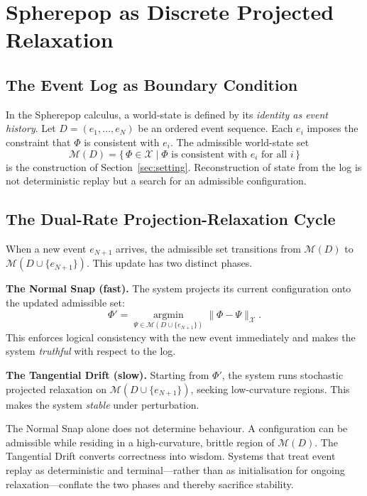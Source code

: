\documentclass[12pt,oneside]{article}
\theoremstyle{plain}
\theoremstyle{definition}
\theoremstyle{remark}
\newcommand{\X}{\mathcal{X}}
\newcommand{\M}{\mathcal{M}}
\newcommand{\D}{D}
\begin{document}
\section{Spherepop as Discrete Projected Relaxation}
\label{sec:spherepop}

\subsection{The Event Log as Boundary Condition}

In the Spherepop calculus, a world-state is defined by its \emph{identity as
event history}. Let $\D = (e_1, \dotsc, e_N)$ be an ordered event sequence.
Each $e_i$ imposes the constraint that $\Phi$ is consistent with $e_i$. The
admissible world-state set
\[
  \M(\D) = \{\,\Phi \in \X \mid \Phi\text{ is consistent with }e_i
  \text{ for all }i\,\}
\]
is the construction of Section~\ref{sec:setting}. Reconstruction of state from
the log is not deterministic replay but a search for an admissible configuration.

\subsection{The Dual-Rate Projection-Relaxation Cycle}

When a new event $e_{N+1}$ arrives, the admissible set transitions from
$\M(\D)$ to $\M(\D \cup \{e_{N+1}\})$. This update has two distinct phases.

\medskip\noindent\textbf{The Normal Snap (fast).} The system projects its
current configuration onto the updated admissible set:
\[
  \Phi' = \operatorname*{argmin}_{\Psi \in \M(\D\cup\{e_{N+1}\})}
  \|\Phi - \Psi\|_\X.
\]
This enforces logical consistency with the new event immediately and makes the
system \emph{truthful} with respect to the log.

\medskip\noindent\textbf{The Tangential Drift (slow).} Starting from $\Phi'$,
the system runs stochastic projected relaxation on $\M(\D\cup\{e_{N+1}\})$,
seeking low-curvature regions. This makes the system \emph{stable} under
perturbation.

The Normal Snap alone does not determine behaviour. A configuration can be
admissible while residing in a high-curvature, brittle region of $\M(\D)$. The
Tangential Drift converts correctness into wisdom. Systems that treat event
replay as deterministic and terminal---rather than as initialisation for ongoing
relaxation---conflate the two phases and thereby sacrifice stability.
\end{document}
